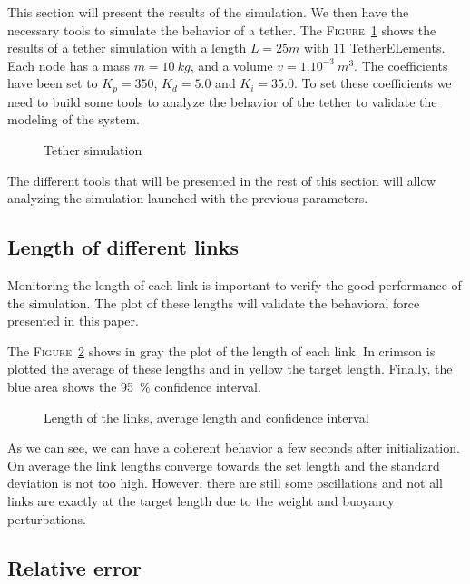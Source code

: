 This section will present the results of the simulation. We then have the necessary tools to simulate the behavior of a tether. The \textsc{Figure}~\ref{fig:simulation} shows the results of a tether simulation with a length $L = 25m$ with $11$ TetherELements. Each node has a mass $m=10\ kg$, and a volume $v=1.10^{-3}\ m^3$. The coefficients have been set to $K_p=350$, $K_d=5.0$ and $K_i=35.0$. To set these coefficients we need to build some tools to analyze the behavior of the tether to validate the modeling of the system.

\begin{figure}[!htb]
    \centering
    \resizebox{0.5\textwidth}{!}{}
    \caption{Tether simulation}
    \label{fig:simulation}
\end{figure}

The different tools that will be presented in the rest of this section will allow analyzing the simulation launched with the previous parameters.

\subsection{Length of different links}

Monitoring the length of each link is important to verify the good performance of the simulation. The plot of these lengths will validate the behavioral force presented in this paper.

The \textsc{Figure}~\ref{fig:length} shows in gray the plot of the length of each link. In crimson is plotted the average of these lengths and in yellow the target length. Finally, the blue area shows the 95~\% confidence interval.

\begin{figure}[!htb]
    \centering
    
    \caption{Length of the links, average length and confidence interval}
    \label{fig:length}
\end{figure}

As we can see, we can have a coherent behavior a few seconds after initialization. On average the link lengths converge towards the set length and the standard deviation is not too high. However, there are still some oscillations and not all links are exactly at the target length due to the weight and buoyancy perturbations.

\subsection{Relative error}


